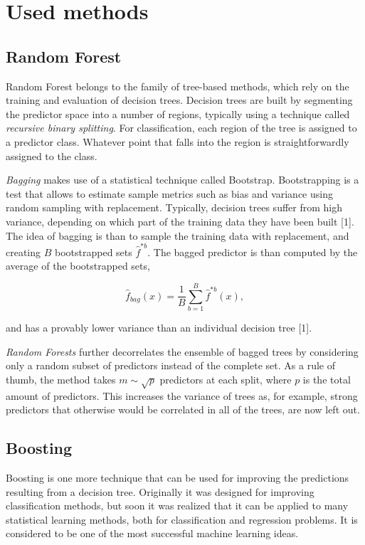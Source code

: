 \documentclass{article}
\begin{document}
\section{Used methods}

\subsection{Random Forest}

Random Forest belongs to the family of tree-based methods, which rely on the training and evaluation of decision trees.
Decision trees are built by segmenting the predictor space into a number of regions, typically using a technique called \textit{recursive binary splitting}.
For classification, each region of the tree is assigned to a predictor class.
Whatever point that falls into the region is straightforwardly assigned to the class.

\textit{Bagging} makes use of a statistical technique called Bootstrap. 
Bootstrapping is a test that allows to estimate sample metrics such as bias and variance using random sampling with replacement.
Typically, decision trees suffer from high variance, depending on which part of the training data they have been built [1].
The idea of bagging is than to sample the training data with replacement, and creating $B$ bootstrapped sets $\hat{f}^{*b}$. 
The bagged predictor is than computed by the average of the bootstrapped sets,

\begin{equation} \label{boost_error_rate}
\hat{f}_{bag}(x)=\frac{1}{B}\sum_{b=1}^{B}\hat{f}^{*b}(x),
\end{equation}

and has a provably lower variance than an individual decision tree [1].

\textit{Random Forests} further decorrelates the ensemble of bagged trees by considering only a random subset of predictors instead of the complete set. As a rule of thumb, the method takes $m \sim  \sqrt{p}$ predictors at each split, where $p$ is the total amount of predictors. This increases the variance of trees as, for example, strong predictors that otherwise would be correlated in all of the trees, are now left out. 

\subsection{Boosting}

Boosting is one more technique that can be used for improving the predictions resulting from a decision tree. Originally it was designed for improving classification methods, but soon it was realized that it can be applied to many statistical learning methods, both for classification and regression problems. It is considered to be one of the most successful machine learning ideas.
\end{document}
